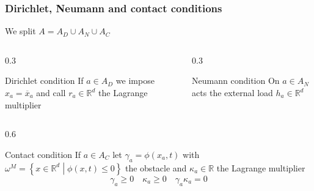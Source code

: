 \documentclass[8pt]{beamer}
\numberwithin{equation}{section}
\theoremstyle{definition}
\begin{document}
\begin{frame}
\frametitle{Dirichlet, Neumann and contact conditions}
\centering
We split $A=A_D\cup A_N\cup A_C$

\begin{columns}
\begin{column}{0.3\framewidth}
\begin{block}{Dirichlet condition}
If $a\in A_D$ we impose $x_a=\overline{x}_a$ and call $r_a\in\mathbb{R}^d$ the Lagrange multiplier
\end{block}
\end{column}
\begin{column}{0.3\framewidth}
\begin{block}{Neumann condition}
On $a\in A_N$ acts the external load $h_a\in\mathbb{R}^d$
\end{block}

\end{column}
\end{columns}

\begin{columns}
\begin{column}{0.6\framewidth}
\begin{block}{Contact condition}
If $a\in A_C$ let $\gamma_a=\phi(x_a,t)$ with
$\omega^M=\left\{x\in\mathbb{R}^d\middle|\phi(x,t)\le0\right\}$ the obstacle and $\kappa_a\in\mathbb{R}$ the Lagrange multiplier
\[
\gamma_a\ge0\quad\kappa_a\ge0\quad\gamma_a\kappa_a=0
\]
\end{block}
\end{column}
\end{columns}

\end{frame}
\end{document}

